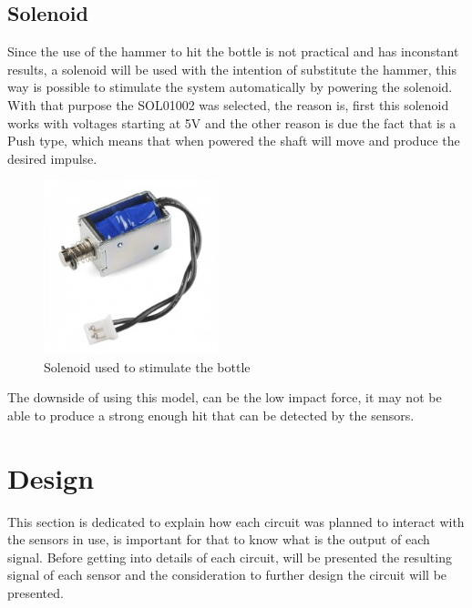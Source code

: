 \subsection{Solenoid}
Since the use of the hammer to hit the bottle is not practical and has inconstant results, a solenoid will be used with the intention of substitute the hammer, this way is possible to stimulate the system automatically by powering the solenoid. With that purpose the SOL01002 was selected, the reason is, first this solenoid works with voltages starting at 5V and the other reason is due the fact that is a Push type, which means that when powered the shaft will move and produce the desired impulse.
\begin{figure}[]
    \centering
    \includegraphics[width=0.45\textwidth]{Chapters/4CHP/Figures/solenoide.jpg}
    \caption{Solenoid used to stimulate the bottle}
    \label{fig:solenoid}
\end{figure}
The downside of using this model, can be the low impact force, it may not be able to produce a strong enough hit that can be detected by the sensors.
\section{Design}
This section is dedicated to explain how each circuit was planned to interact with the sensors in use, is important for that to know what is the output of each signal. Before getting into details of each circuit, will be presented the resulting signal of each sensor and the consideration to further design the circuit will be presented.

